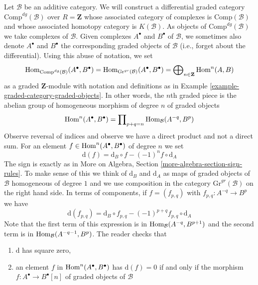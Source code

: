 \begin{example}
\label{example-category-complexes}
Let $\mathcal{B}$ be an additive category. We will construct
a differential graded category $\text{Comp}^{dg}(\mathcal{B})$
over $R = \mathbf{Z}$ whose associated category of complexes
is $\text{Comp}(\mathcal{B})$ and whose associated homotopy
category is $K(\mathcal{B})$. As objects of $\text{Comp}^{dg}(\mathcal{B})$
we take complexes of $\mathcal{B}$. Given complexes
$A^\bullet$ and $B^\bullet$ of $\mathcal{B}$, we sometimes also
denote $A^\bullet$ and $B^\bullet$ the corresponding graded objects
of $\mathcal{B}$ (i.e., forget about the differential).
Using this abuse of notation, we set
$$
\mathop{\mathrm{Hom}}\nolimits_{\text{Comp}^{dg}(\mathcal{B})}(A^\bullet, B^\bullet) =
\mathop{\mathrm{Hom}}\nolimits_{\text{Gr}^{gr}(\mathcal{B})}(A^\bullet, B^\bullet) =
\bigoplus\nolimits_{n \in \mathbf{Z}} \mathop{\mathrm{Hom}}\nolimits^n(A, B)
$$
as a graded $\mathbf{Z}$-module with notation and definitions as
in Example \ref{example-graded-category-graded-objects}.
In other words, the $n$th graded piece is
the abelian group of homogeneous morphism of degree $n$ of graded objects
$$
\mathop{\mathrm{Hom}}\nolimits^n(A^\bullet, B^\bullet) =
\prod\nolimits_{p + q = n} \mathop{\mathrm{Hom}}\nolimits_\mathcal{B}(A^{-q}, B^p)
$$
Observe reversal of indices and observe we have a direct product
and not a direct sum. For an element
$f \in \mathop{\mathrm{Hom}}\nolimits^n(A^\bullet, B^\bullet)$ of degree $n$ we set
$$
\text{d}(f) = \text{d}_B \circ f - (-1)^n f \circ \text{d}_A
$$
The sign is exactly as in
More on Algebra, Section \ref{more-algebra-section-sign-rules}.
To make sense of this we think of $\text{d}_B$ and $\text{d}_A$
as maps of graded objects of $\mathcal{B}$ homogeneous of degree $1$
and we use composition in the category $\text{Gr}^{gr}(\mathcal{B})$
on the right hand side. In terms of components, if $f = (f_{p, q})$ with
$f_{p, q} : A^{-q} \to B^p$ we have
\begin{equation}
\label{equation-differential-hom-complex}
\text{d}(f_{p, q}) =
\text{d}_B \circ f_{p, q} - (-1)^{p + q} f_{p, q} \circ \text{d}_A 
\end{equation}
Note that the first term of this expression is in
$\mathop{\mathrm{Hom}}\nolimits_\mathcal{B}(A^{-q}, B^{p + 1})$ and the second term is in
$\mathop{\mathrm{Hom}}\nolimits_\mathcal{B}(A^{-q - 1}, B^p)$. The reader checks that
\begin{enumerate}
\item $\text{d}$ has square zero,
\item an element $f$ in $\mathop{\mathrm{Hom}}\nolimits^n(A^\bullet, B^\bullet)$
has $\text{d}(f) = 0$ if and only if the morphism
$f : A^\bullet \to B^\bullet[n]$ of graded objects of $\mathcal{B}$

\end{enumerate}
\end{example}
